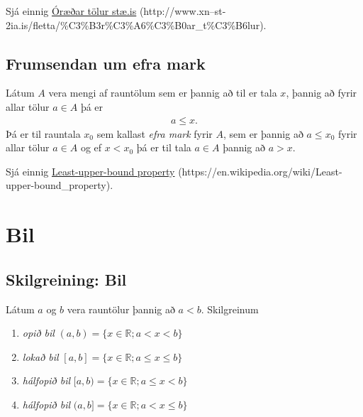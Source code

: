 \documentclass[b5paper,11pt,icelandic]{sphinxmanual}
\begin{document}
Sjá einnig \href{http://www.xn--st-2ia.is/fletta/\%C3\%B3r\%C3\%A6\%C3\%B0ar\_t\%C3\%B6lur}{Óræðar tölur \textbar{} stæ.is} (http://www.xn--st-2ia.is/fletta/\%C3\%B3r\%C3\%A6\%C3\%B0ar\_t\%C3\%B6lur).


\subsection{Frumsendan um efra mark}
\label{kafli01:frumsendanumeframark}\label{kafli01:frumsendan-um-efra-mark}\label{kafli01:index-1}
Látum \(A\) vera mengi af rauntölum sem
er þannig að til er tala \(x\), þannig að fyrir allar tölur
\(a \in A\) þá er
\begin{equation*}
\begin{split}a\leq x.\end{split}
\end{equation*}
Þá er til rauntala \(x_0\) sem kallast \textit{efra mark} fyrir
\(A\), sem er þannig að \(a\leq x_0\) fyrir allar tölur
\(a\in
A\) og ef \(x<x_0\) þá er til tala \(a\in A\) þannig að
\(a>x\).

Sjá einnig \href{https://en.wikipedia.org/wiki/Least-upper-bound\_property}{Least-upper-bound property} (https://en.wikipedia.org/wiki/Least-upper-bound\_property).


\section{Bil}
\label{kafli01:bil}\label{kafli01:skilgreining-1-3-1}

\subsection{Skilgreining: Bil}
\label{kafli01:index-2}\label{kafli01:skilgreining-bil}
Látum \(a\) og \(b\) vera rauntölur þannig að
\(a<b\). Skilgreinum
\begin{enumerate}
\item {} 
\emph{opið bil} \((a,b)=\{x\in \mathbb{R}; a<x<b\}\)

\item {} 
\emph{lokað bil} \([a,b]=\{x\in \mathbb{R}; a\leq x\leq b\}\)

\item {} 
\emph{hálfopið bil} \([a,b)=\{x\in \mathbb{R}; a\leq x<b\}\)

\item {} 
\emph{hálfopið bil} \((a,b]=\{x\in \mathbb{R}; a< x\leq b\}\)

\end{enumerate}
\end{document}
